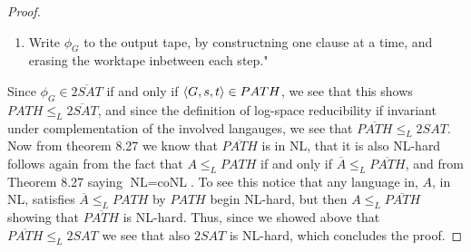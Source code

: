 \documentclass[a4paper,11pt]{article}
\numberwithin{equation}{section}
\begin{document}
\begin{proof}
\begin{enumerate}
				\item Write $ \phi_G $ to the output tape, by constructning one clause at a time, and erasing the worktape inbetween each step."
			\end{enumerate}
			Since $ \phi_G\in \overline{2SAT} $ if and only if $ \braket{G,s,t}\in PATH $, we see that this shows $ PATH\leq_L \overline{2SAT}  $, and since the definition of log-space reducibility if invariant under complementation of the involved langauges, we see that $ \overline{PATH}\leq_L 2SAT $. Now from theorem 8.27 we know that $ \overline{PATH} $ is in NL, that it is also NL-hard follows again from the fact that $ A\leq_L PATH $ if and only if $ \overline{A}\leq_L \overline{PATH} $, and from Theorem 8.27 saying $ \text{NL}=\text{coNL} $. To see this notice that any language in, $ A $, in NL, satisfies $ \overline{A}\leq_L PATH $ by $ PATH $ begin NL-hard, but then $ A\leq_L \overline{PATH} $ showing that $ \overline{PATH} $ is NL-hard. 
			Thus, since we showed above that $ \overline{PATH}\leq_L 2SAT $ we see that also $ 2SAT $ is NL-hard, which concludes the proof.
		\end{proof}
	
	
\end{document}
